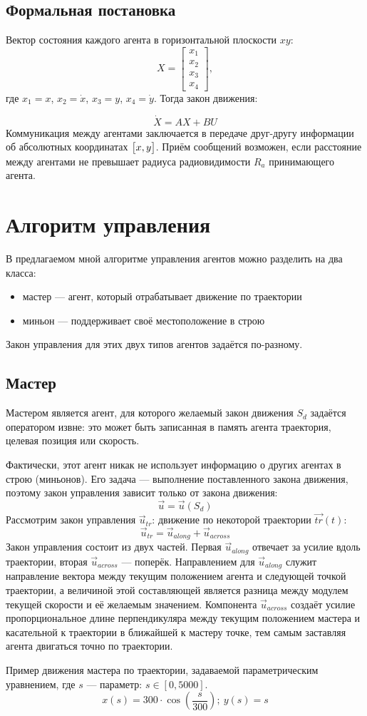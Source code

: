 \documentclass[a4paper, 14pt]{extarticle}
\let\Oldsection\section
\renewcommand{\section}{\FloatBarrier\Oldsection}
\let\Oldsubsection\subsection
\renewcommand{\subsection}{\FloatBarrier\Oldsubsection}
\begin{document}
\subsection{Формальная постановка}
Вектор состояния каждого агента в горизонтальной плоскости $xy$:
$$ X = 
\begin{bmatrix}
	x_1 \\
	x_2 \\
	x_3 \\
	x_4
\end{bmatrix} ,
$$
где $x_1 = x$, $x_2 = \dot{x}$, $x_3 = y$, $x_4 = \dot{y}$. Тогда закон движения: \par
$$\dot{X} = AX + BU$$
Коммуникация между агентами заключается в передаче друг-другу информации об абсолютных координатах $\big{[}x, y\big{]}$. Приём сообщений возможен, если расстояние между агентами не превышает радиуса радиовидимости $R_a$ принимающего агента. \par 
\section{Алгоритм управления}
В предлагаемом мной алгоритме управления агентов можно разделить на два класса:
\begin{itemize}
	\item мастер — агент, который отрабатывает движение по траектории
	\item миньон — поддерживает своё местоположение в строю
\end{itemize}
Закон управления для этих двух типов агентов задаётся по-разному.
\subsection{Мастер}
Мастером является агент, для которого желаемый закон движения $S_d$ задаётся оператором извне: это может быть записанная в память агента траектория, целевая позиция или скорость. \par
Фактически, этот агент никак не использует информацию о других агентах в строю (миньонов). Его задача — выполнение поставленного закона движения, поэтому закон управления зависит только от закона движения:
$$ \vec{u} = \vec{u}(S_d)$$
Рассмотрим закон управления $\vec{u}_{tr}$: движение по некоторой траектории $\vec{tr}(t)$:
$$ \vec{u}_{tr} = \vec{u}_{along} + \vec{u}_{across} $$
Закон управления состоит из двух частей. Первая $\vec{u}_{along}$ отвечает за усилие вдоль траектории, вторая $\vec{u}_{across}$ — поперёк. Направлением для $\vec{u}_{along}$ служит направление вектора между текущим положением агента и следующей точкой траектории, а величиной этой составляющей является разница между модулем текущей скорости и её желаемым значением.  Компонента $\vec{u}_{across}$ создаёт усилие пропорциональное длине перпендикуляра между текущим положением мастера и касательной к траектории в ближайшей к мастеру точке, тем самым заставляя агента двигаться точно по траектории. \par
\bigskip
Пример движения мастера по траектории, задаваемой параметрическим уравнением, где $s$ — параметр: $s \in [0, 5000]$.
$$x(s) = 300 \cdot \cos(\frac{s}{300}); \ y(s) = s$$
\end{document}
